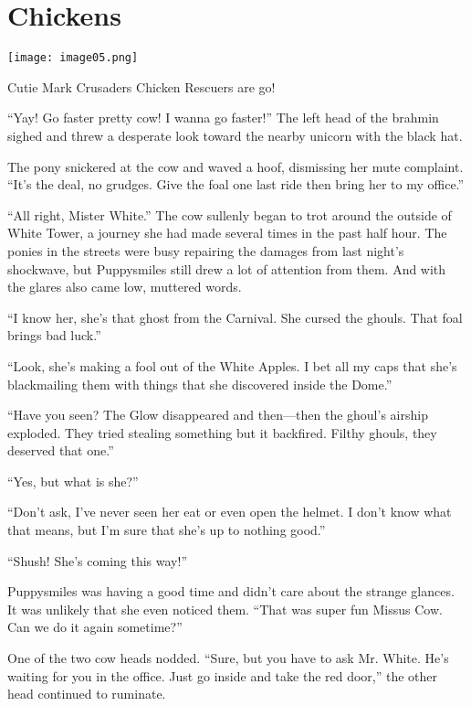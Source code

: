 
\chapter{Chickens}

\texttt{[image: image05.png]}

\begin{intro}
Cutie Mark Crusaders Chicken Rescuers are go!
\end{intro}



``Yay! Go faster pretty cow! I wanna go faster!'' The left head of the brahmin sighed and threw a desperate look toward the nearby unicorn with the black hat.

The pony snickered at the cow and waved a hoof, dismissing her mute complaint. ``It's the deal, no grudges. Give the foal one last ride then bring her to my office.''

``All right, Mister White.'' The cow sullenly began to trot around the outside of White Tower, a journey she had made several times in the past half hour. The ponies in the streets were busy repairing the damages from last night's shockwave, but Puppysmiles still drew a lot of attention from them. And with the glares also came low, muttered words.

``I know her, she's that ghost from the Carnival. She cursed the ghouls. That foal brings bad luck.''

``Look, she's making a fool out of the White Apples. I bet all my caps that she's blackmailing them with things that she discovered inside the Dome.''

``Have you seen? The Glow disappeared and then---then the ghoul's airship exploded. They tried stealing something but it backfired. Filthy ghouls, they deserved that one.''

``Yes, but what is she?''

``Don't ask, I've never seen her eat or even open the helmet. I don't know what that means, but I'm sure that she's up to nothing good.''

``Shush! She's coming this way!''

Puppysmiles was having a good time and didn't care about the strange glances. It was unlikely that she even noticed them. ``That was super fun Missus Cow. Can we do it again sometime?''

One of the two cow heads nodded. ``Sure, but you have to ask Mr. White. He's waiting for you in the office. Just go inside and take the red door,'' the other head continued to ruminate.

